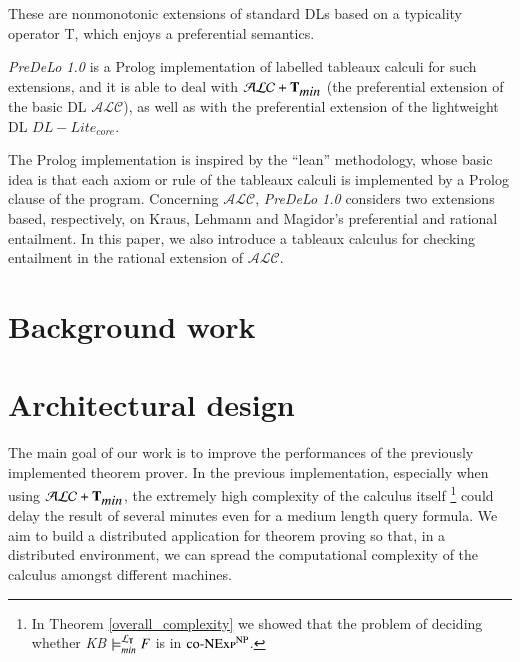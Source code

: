 \documentclass[a4paper, 11pt, oneside]{elsarticle}
\newcommand{\tip}{{\bf T}}
\newcommand{\alc}{\mathcal{ALC}}
\newcommand{\alctmin}{\mathcal{ALC}+\tip_{\mbox{\em min}}}
\newcommand{\ellet} {\mathcal{L}_{\bf T}}
\begin{document}
These are nonmonotonic extensions of standard DLs based on a typicality operator T, which enjoys a preferential semantics.

\emph{PreDeLo 1.0} is a Prolog implementation of labelled tableaux calculi for such extensions, and it is able to deal with $\alctmin$ (the preferential extension of the basic DL $\alc$), as well as with the preferential extension of the lightweight DL $DL-Lite_{core}$.

The Prolog implementation is inspired by the “lean” methodology, whose basic idea is that each axiom or rule of the tableaux calculi is implemented by a Prolog clause of the program.
Concerning $\alc$, \emph{PreDeLo 1.0} considers two extensions based, respectively, on Kraus, Lehmann and Magidor’s preferential and rational entailment.
In this paper, we also introduce a tableaux calculus for checking entailment in the rational extension of $\alc$.


\section{Background work}\label{bg}


\section{Architectural design}\label{arch}

The main goal of our work is to improve the performances of the previously implemented theorem prover. In the previous implementation, especially when using $\alctmin$, the extremely high complexity of the calculus itself
\footnote{In Theorem \ref{overall_complexity} we showed that the problem of deciding whether \emph{KB} $\models_{min}^{\ellet} F$ is in $\textsc{co-NExp}^\textsc{NP}$.}
could delay the result of several minutes even for a medium length query formula.
We aim to build a distributed application for theorem proving so that, in a distributed environment, we can spread the computational complexity of the calculus amongst different machines.\\
\end{document}
